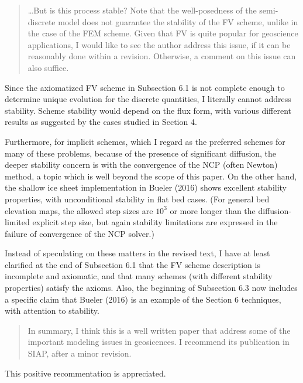 \documentclass[12pt]{amsart}
\begin{document}
\begin{quote}
\dots  But is this process stable? Note that the well-posedness of the semi-discrete model does not guarantee the stability of the FV scheme, unlike in the case of the FEM scheme.  Given that FV is quite popular for geoscience applications, I would like to see the author address this issue, if it can be reasonably done within a revision. Otherwise, a comment on this issue can also suffice.
\end{quote}

Since the axiomatized FV scheme in Subsection 6.1 is not complete enough to determine unique evolution for the discrete quantities, I literally cannot address stability.  Scheme stability would depend on the flux form, with various different results as suggested by the cases studied in Section 4.

Furthermore, for implicit schemes, which I regard as the preferred schemes for many of these problems, because of the presence of significant diffusion, the deeper stability concern is with the convergence of the NCP (often Newton) method, a topic which is well beyond the scope of this paper.  On the other hand, the shallow ice sheet implementation in Bueler (2016) shows excellent stability properties, with unconditional stability in flat bed cases.  (For general bed elevation maps, the allowed step sizes are $10^3$ or more longer than the diffusion-limited explicit step size, but again stability limitations are expressed in the failure of convergence of the NCP solver.)

Instead of speculating on these matters in the revised text, I have at least clarified at the end of Subsection 6.1 that the FV scheme description is incomplete and axiomatic, and that many schemes (with different stability properties) satisfy the axioms.  Also, the beginning of Subsection 6.3 now includes a specific claim that Bueler (2016) is an example of the Section 6 techniques, with attention to stability.

\begin{quote}
In summary, I think this is a well written paper that address some of the important modeling issues in geosicences.  I recommend its publication in SIAP, after a minor revision.
\end{quote}

This positive recommentation is appreciated.
\end{document}
